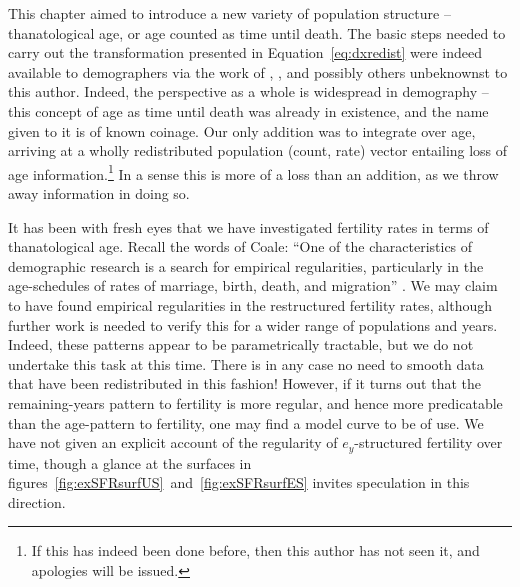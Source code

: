 \FloatBarrier
\label{sec:esfrreflections}
This chapter aimed to introduce a new variety of population structure --
thanatological age, or age counted as time until death. The basic steps needed
to carry out the transformation presented in Equation~\eqref{eq:dxredist} were
indeed available to demographers via the work of
\citet{miller2001increasing}, \citet{lee2002approach}, \citet{vaupel2009life}
and possibly others unbeknownst to this author. Indeed, the perspective as a
whole is widespread in demography -- this concept of age as time until death
was already in existence, and the name given to it is of known coinage. Our only
addition was to integrate over age, arriving at a wholly 
redistributed population (count, rate) vector entailing loss of age
information.\footnote{If this has indeed been done before, then this author has
not seen it, and apologies will be issued.} In a sense this is more of a loss
than an addition, as we throw away information in doing so. 

It has been with fresh eyes that we have investigated fertility rates in terms
of thanatological age. Recall the words of Coale:
``One of the characteristics of demographic research is a search for empirical regularities, particularly in the
age-schedules of rates of marriage, birth, death, and
migration'' \citep{coale1996development}. We may claim to have found
empirical regularities in the restructured fertility rates, although further
work is needed to verify this for a wider range of populations and years.
Indeed, these patterns appear to be parametrically tractable, but we do not
undertake this task at this time. There is in any case no need to smooth data
that have been redistributed in this fashion! However, if it turns out that the remaining-years pattern to fertility is more regular, and hence more
predicatable than the age-pattern to fertility, one may find a model curve to
be of use. We have not given an explicit account of the regularity of
$e_y$-structured fertility over time, though a glance at the surfaces in
figures~\ref{fig:exSFRsurfUS}~and~\ref{fig:exSFRsurfES} invites speculation in
this direction.
 
